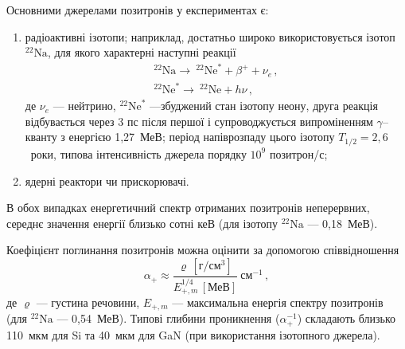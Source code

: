\documentclass[10pt,a5paper,titlepage,oneside]{book}
\numberwithin{equation}{part}
\begin{document}
Основними джерелами позитронів у експериментах є:
\begin{enumerate}[label=\asbuk*),leftmargin=0em,itemindent=1.5em]
  \item радіоактивні ізотопи;
  наприклад, достатньо широко використовується ізотоп $^{22}\text{Na}$, для якого характерні наступні реакції
  \begin{gather*}
  ^{22}\text{Na}\rightarrow \:^{22}\text{Ne}^{*}+\beta^++\nu_e\,,\\
  ^{22}\text{Ne}^{*}\rightarrow \:^{22}\text{Ne}+h\nu\,,
  \end{gather*}
де
$\nu_e$ --- нейтрино,
$^{22}\text{Ne}^{*}$ ---збуджений стан ізотопу неону,
друга реакція відбувається через 3 пс після першої і супроводжується
випроміненням $\gamma$--кванту з енергією 1,27~МеВ;
період напіврозпаду цього ізотопу $T_{1/2}=2,6$~роки, типова інтенсивність джерела порядку $10^9$ позитрон/с;
  \item ядерні реактори чи прискорювачі.
\end{enumerate}
В обох випадках енергетичний спектр отриманих позитронів неперервних,
середнє значення енергії близько сотні кеВ (для ізотопу $^{22}\text{Na}$ --- 0,18~МеВ).

Коефіцієнт поглинання позитронів можна оцінити за допомогою співвідношення \cite{PAS}
\begin{equation}
\alpha_+\approx\frac{\varrho\,\left[\text{г}/\text{см}^3\right]}{E_{+,m}^{1/4}\,[\text{МеВ}]}\:\text{см}^{-1}\,,
\end{equation}
де
$\varrho$ --- густина речовини,
$E_{+,m}$ --- максимальна енергія спектру позитронів (для $^{22}\text{Na}$ --- 0,54~МеВ).
Типові глибини проникнення ($\alpha^{-1}_+$) складають близько 110~мкм для Si та 40~мкм для GaN (при використання ізотопного джерела).
\end{document}
